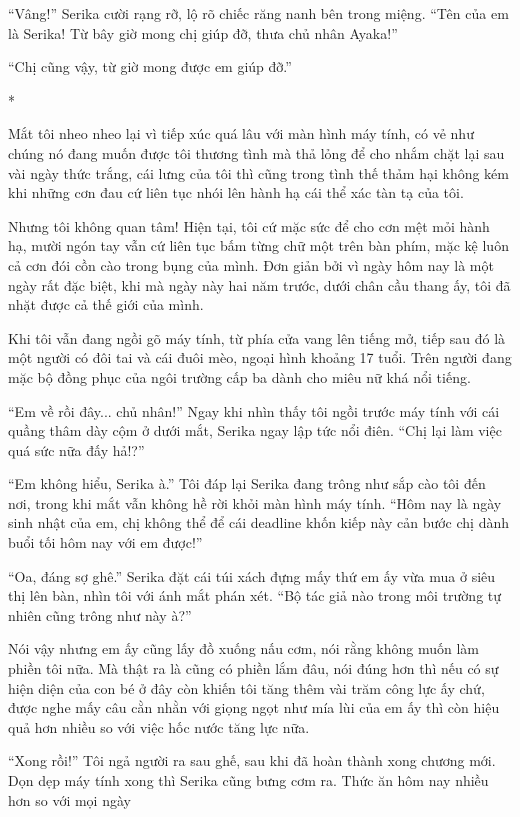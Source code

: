 {``Vâng!'' Serika cười rạng rỡ, lộ rõ chiếc răng nanh bên trong miệng.
``Tên của em là Serika! Từ bây giờ mong chị giúp đỡ, thưa chủ nhân
Ayaka!''

``Chị cũng vậy, từ giờ mong được em giúp đỡ.''

*

Mắt tôi nheo nheo lại vì tiếp xúc quá lâu với màn hình máy tính, có vẻ
như chúng nó đang muốn được tôi thương tình mà thả lỏng để cho nhắm chặt
lại sau vài ngày thức trắng, cái lưng của tôi thì cũng trong tình thế
thảm hại không kém khi những cơn đau cứ liên tục nhói lên hành hạ cái
thể xác tàn tạ của tôi.

Nhưng tôi không quan tâm! Hiện tại, tôi cứ mặc sức để cho cơn mệt mỏi
hành hạ, mười ngón tay vẫn cứ liên tục bấm từng chữ một trên bàn phím,
mặc kệ luôn cả cơn đói cồn cào trong bụng của mình. Đơn giản bởi vì ngày
hôm nay là một ngày rất đặc biệt, khi mà ngày này hai năm trước, dưới
chân cầu thang ấy, tôi đã nhặt được cả thế giới của mình.

Khi tôi vẫn đang ngồi gõ máy tính, từ phía cửa vang lên tiếng mở, tiếp
sau đó là một người có đôi tai và cái đuôi mèo, ngoại hình khoảng 17
tuổi. Trên người đang mặc bộ đồng phục của ngôi trường cấp ba dành cho
miêu nữ khá nổi tiếng.

``Em về rồi đây... chủ nhân!'' Ngay khi nhìn thấy tôi ngồi trước máy
tính với cái quầng thâm dày cộm ở dưới mắt, Serika ngay lập tức nổi
điên. ``Chị lại làm việc quá sức nữa đấy hả!?''

``Em không hiểu, Serika à.'' Tôi đáp lại Serika đang trông như sắp cào
tôi đến nơi, trong khi mắt vẫn không hề rời khỏi màn hình máy tính.
``Hôm nay là ngày sinh nhật của em, chị không thể để cái deadline khốn
kiếp này cản bước chị dành buổi tối hôm nay với em được!''

``Oa, đáng sợ ghê.'' Serika đặt cái túi xách đựng mấy thứ em ấy vừa mua
ở siêu thị lên bàn, nhìn tôi với ánh mắt phán xét. ``Bộ tác giả nào
trong môi trường tự nhiên cũng trông như này à?''

Nói vậy nhưng em ấy cũng lấy đồ xuống nấu cơm, nói rằng không muốn làm
phiền tôi nữa. Mà thật ra là cũng có phiền lắm đâu, nói đúng hơn thì nếu
có sự hiện diện của con bé ở đây còn khiến tôi tăng thêm vài trăm công
lực ấy chứ, được nghe mấy câu cằn nhằn với giọng ngọt như mía lùi của em
ấy thì còn hiệu quả hơn nhiều so với việc hốc nước tăng lực nữa.

``Xong rồi!'' Tôi ngả người ra sau ghế, sau khi đã hoàn thành xong
chương mới. Dọn dẹp máy tính xong thì Serika cũng bưng cơm ra. Thức ăn
hôm nay nhiều hơn so với mọi ngày

}
